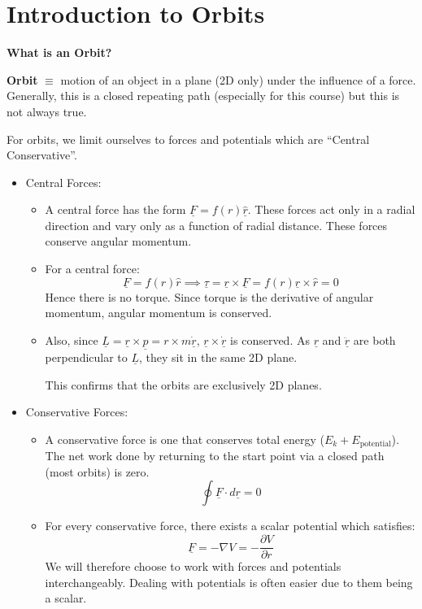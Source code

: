 
\section{Introduction to Orbits}
\begin{tcolorbox}
    \textbf{What is an Orbit?}

    \textbf{Orbit} $\equiv$ motion of an object in a plane (2D only) under the influence of a force. Generally, this is a closed repeating path (especially for this course) but this is not always true.
\end{tcolorbox}

For orbits, we limit ourselves to forces and potentials which are ``Central Conservative''.
\begin{itemize}
    \item Central Forces:
    \begin{itemize}
        \item A central force has the form $\underline{F} = f(r) \hat{\underline{r}}$. These forces act only in a radial direction and vary only as a function of radial distance. These forces conserve angular momentum.
        \item For a central force:
        \[
            \underline{F} = f(r) \hat{r} \implies \underline{\tau} = \underline{r} \times \underline{F} = f(r) \underline{r} \times \hat{r} = 0
        \]
        Hence there is no torque. Since torque is the derivative of angular momentum, angular momentum is conserved.
        \item Also, since $\underline{L} = \underline{r} \times \underline{p} = r \times m \dot{\underline{r}}$, $\underline{r} \times \dot{\underline{r}}$ is conserved. As $\underline{r}$ and $\ddot{\underline{r}}$ are both perpendicular to $\underline{L}$, they sit in the same 2D plane.
        
        This confirms that the orbits are exclusively 2D planes.
        
    \end{itemize}
    \item Conservative Forces:
    \begin{itemize}
        \item A conservative force is one that conserves total energy ($E_k + E_\text{potential}$). The net work done by returning to the start point via a closed path (most orbits) is zero.
        \[
            \oint \underline{F} \cdot d \underline{r} = 0
            \]
            \item For every conservative force, there exists a scalar potential which satisfies:
            \[
                \underline{F} = - \nabla V = - \frac{\partial V}{\partial r}
            \]
            We will therefore choose to work with forces and potentials interchangeably. Dealing with potentials is often easier due to them being a scalar.
    \end{itemize}
                
\end{itemize}

